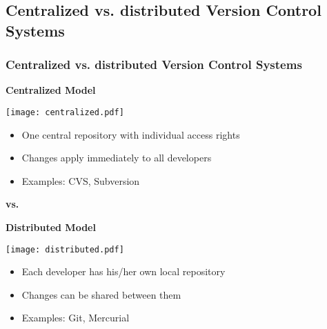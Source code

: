 \documentclass{beamer}
\begin{document}
\subsection{Centralized vs. distributed Version Control Systems}
\begin{frame}[fragile]
  \frametitle{Centralized vs. distributed Version Control Systems}
  \begin{minipage}{0.45\linewidth}
    \begin{center}
      \textbf{Centralized Model}
    \end{center}
    \texttt{[image: centralized.pdf]}
    \begin{itemize}
      \item One central repository with individual access rights
      \item Changes apply immediately to all developers
      \item Examples: CVS, Subversion
    \end{itemize}
  \end{minipage}
  \textbf{vs.}
  \begin{minipage}{0.45\linewidth}
    \begin{center}
      \textbf{Distributed Model}
    \end{center}
    \texttt{[image: distributed.pdf]}
    \begin{itemize}
      \item Each developer has his/her own local repository
      \item Changes can be shared between them
      \item Examples: Git, Mercurial
    \end{itemize}
  \end{minipage}
% 
\end{frame}
\end{document}
